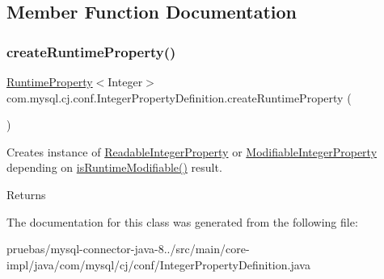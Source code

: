 \subsection{Member Function Documentation}
\mbox{\label{classcom_1_1mysql_1_1cj_1_1conf_1_1_integer_property_definition_a446876e16f36d1c1731cfdf5174b7942}} 
\subsubsection{\texorpdfstring{create\+Runtime\+Property()}{createRuntimeProperty()}}
{\footnotesize\ttfamily \mbox{\hyperlink{interfacecom_1_1mysql_1_1cj_1_1conf_1_1_runtime_property}{Runtime\+Property}}$<$Integer$>$ com.\+mysql.\+cj.\+conf.\+Integer\+Property\+Definition.\+create\+Runtime\+Property (\begin{DoxyParamCaption}{ }\end{DoxyParamCaption})}

Creates instance of \mbox{\hyperlink{classcom_1_1mysql_1_1cj_1_1conf_1_1_readable_integer_property}{Readable\+Integer\+Property}} or \mbox{\hyperlink{classcom_1_1mysql_1_1cj_1_1conf_1_1_modifiable_integer_property}{Modifiable\+Integer\+Property}} depending on \mbox{\hyperlink{classcom_1_1mysql_1_1cj_1_1conf_1_1_abstract_property_definition_a6c98140b2db84ccd0ff29ce165ec9ef5}{is\+Runtime\+Modifiable()}} result.

\begin{DoxyReturn}{Returns}

\end{DoxyReturn}


The documentation for this class was generated from the following file\+:\begin{DoxyCompactItemize}
\item 
pruebas/mysql-\/connector-\/java-\/8../src/main/core-\/impl/java/com/mysql/cj/conf/Integer\+Property\+Definition.\+java\end{DoxyCompactItemize}
